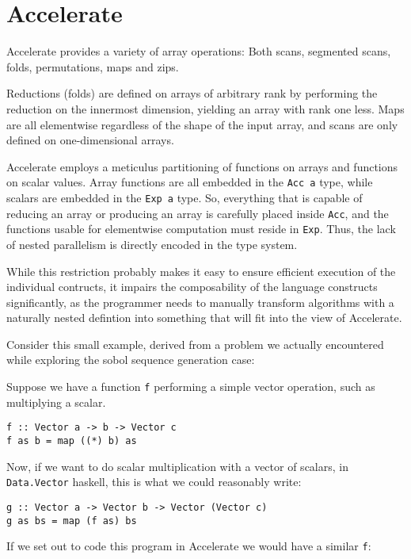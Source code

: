 \section{Accelerate}

Accelerate provides a variety of array operations: Both scans, segmented
scans, folds, permutations, maps and zips.

Reductions (folds) are defined on arrays of arbitrary rank by performing the
reduction on the innermost dimension, yielding an array with rank one less.
Maps are all elementwise regardless of the shape of the input array, and scans
are only defined on one-dimensional arrays.

Accelerate employs a meticulus partitioning of functions on arrays and functions
on scalar values. Array functions are all embedded in the \texttt{Acc a} type,
while scalars are embedded in the \texttt{Exp a} type. So, everything that is
capable of reducing an array or producing an array is carefully placed inside
\texttt{Acc}, and the functions usable for elementwise computation must
reside in \texttt{Exp}. Thus, the lack of nested parallelism is directly
encoded in the type system.

While this restriction probably makes it easy to ensure efficient execution of
the individual contructs, it impairs the composability of the language
constructs significantly, as the programmer needs to manually transform
algorithms with a naturally nested defintion into something that will fit into
the view of Accelerate.

Consider this small example, derived from a problem we actually encountered
while exploring the sobol sequence generation case:

Suppose we have a function \texttt{f} performing a simple vector operation,
such as multiplying a scalar.

\begin{verbatim}
f :: Vector a -> b -> Vector c
f as b = map ((*) b) as
\end{verbatim}

Now, if we want to do scalar multiplication with a vector of scalars, in
\texttt{Data.Vector} haskell, this is what we could reasonably write:

\begin{verbatim}
g :: Vector a -> Vector b -> Vector (Vector c)
g as bs = map (f as) bs
\end{verbatim}

If we set out to code this program in Accelerate we would have a similar
\texttt{f}:

